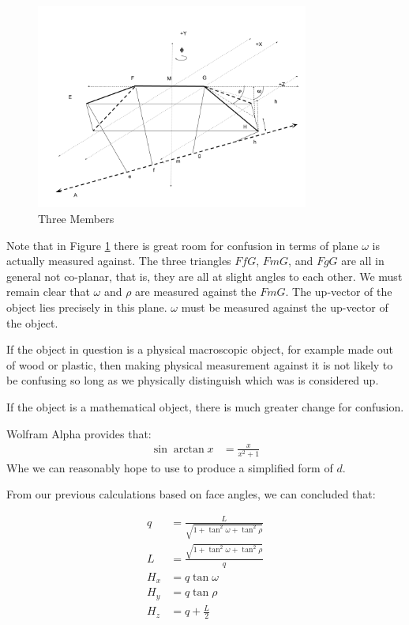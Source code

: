 \documentclass[11pt]{article}
\begin{document}
{\begin{figure}
     \centering
     \includegraphics[width=0.80\textwidth]{figures/TwoAngleDiagram.png}
     \caption{Three Members}
  \label{fig:threemembersdiagram}
\end{figure}

Note that in Figure \ref{fig:threemembersdiagram} there is great
room for confusion in terms of plane $\omega$ is actually
measured against. The three triangles $FfG$, $FmG$, and $FgG$
are all in general not co-planar, that is, they are all at
slight angles to each other.  We must remain clear that $\omega$
and $\rho$ are measured against the $FmG$. The up-vector
of the object lies precisely in this plane. $\omega$ must
be measured against the up-vector of the object.

If the object in question is a physical macroscopic object,
for example made out of wood or plastic, then making
physical measurement against it is not likely to be confusing
so long as we physically distinguish which was is considered
up.

If the object is a mathematical object, there is much
greater change for confusion.

Wolfram Alpha provides that:
\begin{align}
  \sin{\arctan{x}} &= \frac{x}{x^2 + 1}
\end{align}
Whe we can reasonably hope to use to produce a simplified form of
$d$.

From our previous calculations based on face angles, we can
concluded that:

\begin{align}
  q &= \frac{L}{\sqrt{1 + \tan^2{\omega} + \tan^2{\rho}}}  \\
  L &= \frac{\sqrt{1 + \tan^2{\omega} + \tan^2{\rho}}}{q}  \\  
  H_x &= q \tan{\omega} \\
  H_y &= q \tan{\rho} \\
  H_z &= q + \frac{L}{2}
\end{align}

}
\end{document}
